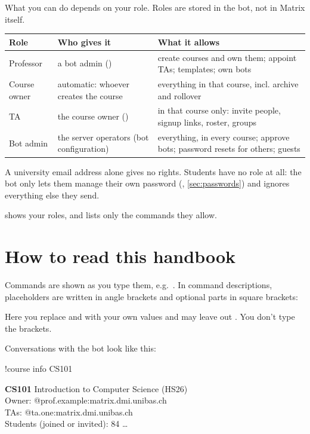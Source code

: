 What you can do depends on your role. Roles are stored in the bot, not in Matrix itself.

\begin{center}
\begin{tabularx}{\textwidth}{@{}lLL@{}}
\toprule
\textbf{Role} & \textbf{Who gives it} & \textbf{What it allows} \\
\midrule
Professor & a bot admin () & create courses and own them; appoint TAs; templates; own bots \\
Course owner & automatic: whoever creates the course & everything in that course, incl. archive and rollover \\
TA & the course owner () & in that course only: invite people, signup links, roster, groups \\
Bot admin & the server operators (bot configuration) & everything, in every course; approve bots; password resets for others; guests \\
\bottomrule
\end{tabularx}
\end{center}

A university email address alone gives no rights. Students have no role at all: the bot
only lets them manage their own password (, \autoref{sec:passwords}) and
ignores everything else they send.

 shows your roles, and  lists only the commands they allow.

\section{How to read this handbook}

Commands are shown as you type them, e.g.\ . In command
descriptions, placeholders are written in angle brackets and optional parts in square
brackets:

\begin{center}
\end{center}

Here you replace  and  with your own values and may leave out
. You don't type the brackets.

Conversations with the bot look like this:

\begin{you}
!course info CS101
\end{you}
\begin{botreply}
\textbf{CS101} Introduction to Computer Science (HS26)\\
Owner: @prof.example:matrix.dmi.unibas.ch\\
TAs: @ta.one:matrix.dmi.unibas.ch\\
Students (joined or invited): 84 \dots
\end{botreply}

